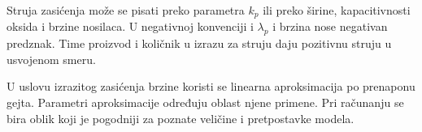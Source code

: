Struja zasićenja može se pisati preko parametra $k_p$ ili preko širine, kapacitivnosti oksida i brzine nosilaca. U negativnoj konvenciji i $\lambda_p$ i brzina nose negativan predznak. Time proizvod i količnik u izrazu za struju daju pozitivnu struju u usvojenom smeru.

U uslovu izrazitog zasićenja brzine koristi se linearna aproksimacija po prenaponu gejta. Parametri aproksimacije određuju oblast njene primene. Pri računanju se bira oblik koji je pogodniji za poznate veličine i pretpostavke modela.
